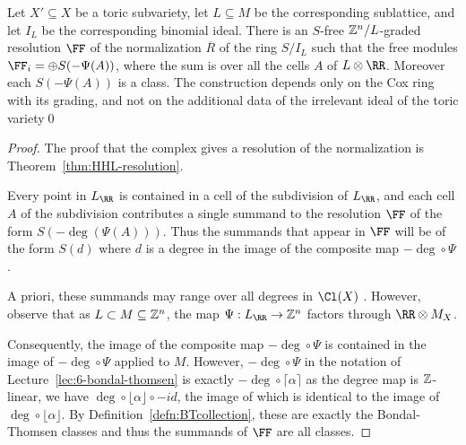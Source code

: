 \documentclass{amsart}
\begin{document}
\begin{cor}
  \label{cor:hhlSummandsBT}
  Let $X'\subseteq X$ be a toric subvariety,  let $L\subseteq M$ be the corresponding sublattice, and let $I_{L}$ be the corresponding binomial ideal. There is an $S$-free $\mathbb Z^{n}/L$-graded resolution $\FF$ of the
  normalization $\overline R$ of the ring $S/I_{L}$ such that the free modules $\FF_{i} = \oplus S(-\Psi(A))$, where the sum is over all the cells  $A$ of $L \otimes \RR$. Moreover each $S(-\Psi(A))$ is a \BT class. 
  The construction depends only on the Cox ring with its grading, and not on the additional data of the
  irrelevant ideal of the toric variety\qed
\end{cor}
\begin{proof}
  
  The proof that the complex gives a resolution of the normalization is Theorem~\ref{thm:HHL-resolution}. 
  
  Every point in $L_{\RR}$ is contained in a cell of the subdivision of $L_{\RR}$, and each cell $A$ of the subdivision
  contributes a single summand to the resolution $\FF$ of the form $S(-\deg(\Psi(A)))$.
  Thus the summands that appear in $\FF$ will be of the form $S(d)$ where $d$ is a degree in the image of the composite map $-\deg \circ \Psi$.

  A priori, these summands may range over all degrees in $\Cl(X)$ . However, observe that as $L\subset M\subseteq \mathbb Z^n$, the map $\Psi:L_{\RR}\rightarrow \ZZ^n$ factors through $\RR \otimes M_X$.

  Consequently, the image of the composite map $-\deg \circ \Psi$ is contained in the image of $-\deg \circ \Psi$ applied to $M$. However, $-\deg \circ \Psi$ in the notation of Lecture~\ref{lec:6-bondal-thomsen} is exactly $- \deg \circ \lceil \alpha \rceil$ as the degree map is $\mathbb Z$-linear, we have $\deg \circ \lfloor \alpha\rfloor \circ -id$, the image of which is identical to the image of $\deg \circ \lfloor \alpha \rfloor$. By Definition~\ref{defn:BTcollection}, these are exactly the Bondal-Thomsen classes and thus the summands of $\FF$ are all \BT classes.
\end{proof}
\end{document}
